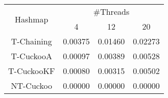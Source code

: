 \begin{tabular}{|c|c|c|c|}
\hline
\multirow{2}{*}{Hashmap} & \multicolumn{3}{c|}{\#Threads}\\\cline{2-4}& 4 & 12 & 20\\
\hline
\hline
T-Chaining & 0.00375 & 0.01460 & 0.02273\\
T-CuckooA & 0.00097 & 0.00389 & 0.00528\\
T-CuckooKF & 0.00080 & 0.00315 & 0.00502\\
NT-Cuckoo & 0.00000 & 0.00000 & 0.00000\\
\hline
\end{tabular}

